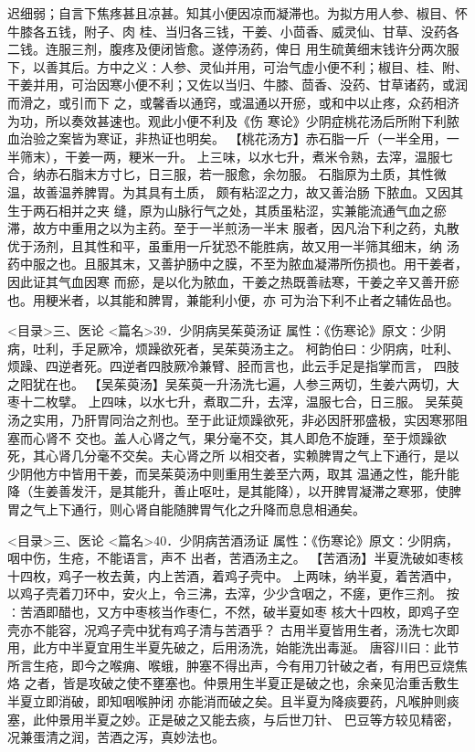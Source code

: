 \documentclass[a4paper,12pt,UTF8,twoside]{ctexbook}
\begin{document}
迟细弱；自言下焦疼甚且凉甚。知其小便因凉而凝滞也。为拟方用人参、椒目、怀牛膝各五钱，附子、肉 
桂、当归各三钱，干姜、小茴香、威灵仙、甘草、没药各二钱。连服三剂，腹疼及便闭皆愈。遂停汤药，俾日 
用生硫黄细末钱许分两次服下，以善其后。方中之义∶人参、灵仙并用，可治气虚小便不利；椒目、桂、附、 
干姜并用，可治因寒小便不利；又佐以当归、牛膝、茴香、没药、甘草诸药，或润而滑之，或引而下 
之，或馨香以通窍，或温通以开瘀，或和中以止疼，众药相济为功，所以奏效甚速也。观此小便不利及《伤 
寒论》少阴症桃花汤后所附下利脓血治验之案皆为寒证，非热证也明矣。 
【桃花汤方】赤石脂一斤（一半全用，一半筛末），干姜一两，粳米一升。 
上三味，以水七升，煮米令熟，去滓，温服七合，纳赤石脂末方寸匕，日三服，若一服愈，余勿服。 
石脂原为土质，其性微温，故善温养脾胃。为其具有土质， 
颇有粘涩之力，故又善治肠 下脓血。又因其生于两石相并之夹 
缝，原为山脉行气之处，其质虽粘涩，实兼能流通气血之瘀滞，故方中重用之以为主药。至于一半煎汤一半末 
服者，因凡治下利之药，丸散优于汤剂，且其性和平，虽重用一斤犹恐不能胜病，故又用一半筛其细末，纳 
汤药中服之也。且服其末，又善护肠中之膜，不至为脓血凝滞所伤损也。用干姜者，因此证其气血因寒 
而瘀，是以化为脓血，干姜之热既善祛寒，干姜之辛又善开瘀也。用粳米者，以其能和脾胃，兼能利小便，亦 
可为治下利不止者之辅佐品也。 

<目录>三、医论
<篇名>39．少阴病吴茱萸汤证
属性：《伤寒论》原文∶少阴病，吐利，手足厥冷，烦躁欲死者，吴茱萸汤主之。 
柯韵伯曰∶少阴病，吐利、烦躁、四逆者死。四逆者四肢厥冷兼臂、胫而言也，此云手足是指掌而言， 
四肢之阳犹在也。 
【吴茱萸汤】吴茱萸一升汤洗七遍，人参三两切，生姜六两切，大枣十二枚擘。 
上四味，以水七升，煮取二升，去滓，温服七合，日三服。 
吴茱萸汤之实用，乃肝胃同治之剂也。至于此证烦躁欲死，非必因肝邪盛极，实因寒邪阻塞而心肾不 
交也。盖人心肾之气，果分毫不交，其人即危不旋踵，至于烦躁欲死，其心肾几分毫不交矣。夫心肾之所 
以相交者，实赖脾胃之气上下通行，是以少阴他方中皆用干姜，而吴茱萸汤中则重用生姜至六两，取其 
温通之性，能升能降（生姜善发汗，是其能升，善止呕吐，是其能降），以开脾胃凝滞之寒邪，使脾 
胃之气上下通行，则心肾自能随脾胃气化之升降而息息相通矣。 

<目录>三、医论
<篇名>40．少阴病苦酒汤证
属性：《伤寒论》原文∶少阴病，咽中伤，生疮，不能语言，声不 
出者，苦酒汤主之。 
【苦酒汤】半夏洗破如枣核十四枚，鸡子一枚去黄，内上苦酒，着鸡子壳中。 
上两味，纳半夏，着苦酒中，以鸡子壳着刀环中，安火上，令三沸，去滓，少少含咽之，不瘥，更作三剂。 
按∶苦酒即醋也，又方中枣核当作枣仁，不然，破半夏如枣 
核大十四枚，即鸡子空壳亦不能容，况鸡子壳中犹有鸡子清与苦酒乎？ 
古用半夏皆用生者，汤洗七次即用，此方中半夏宜用生半夏先破之，后用汤洗，始能洗出毒涎。 
唐容川曰∶此节所言生疮，即今之喉痈、喉蛾，肿塞不得出声，今有用刀针破之者，有用巴豆烧焦烙 
之者，皆是攻破之使不壅塞也。仲景用生半夏正是破之也，余亲见治重舌敷生半夏立即消破，即知咽喉肿闭 
亦能消而破之矣。且半夏为降痰要药，凡喉肿则痰塞，此仲景用半夏之妙。正是破之又能去痰，与后世刀针、 
巴豆等方较见精密，况兼蛋清之润，苦酒之泻，真妙法也。 
\end{document}
